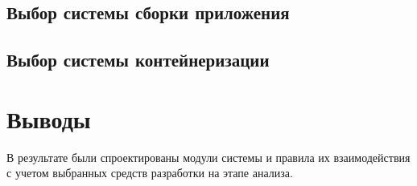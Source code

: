 \subsection{Выбор системы сборки приложения}
\subsection{Выбор системы контейнеризации}

\section{Выводы}

В результате были спроектированы модули системы и правила их взаимодействия с учетом выбранных средств разработки
на этапе анализа.












